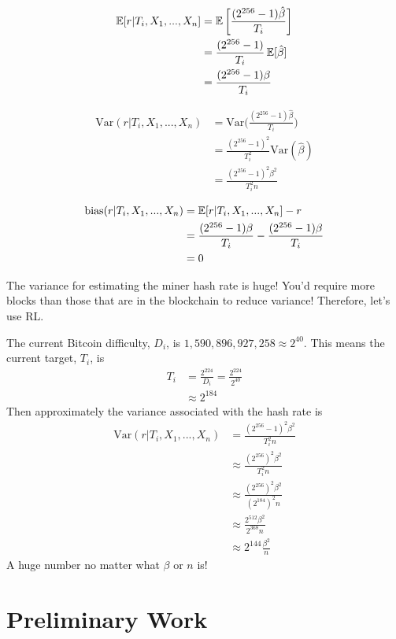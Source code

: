 \begin{align}
\operatorname{\mathbb{E}}[r|T_i,X_1,...,X_n] &= \operatorname{\mathbb{E}}\bigg[\frac{(2^{256}-1)\hat{\beta}}{T_i}\bigg] \\
&= \frac{(2^{256}-1)}{T_i}\operatorname{\mathbb{E}}[\hat{\beta}] \\
&= \frac{(2^{256}-1)\beta}{T_i}
\end{align}

\begin{align}
\text{Var}(r|T_i,X_1,...,X_n) &= \text{Var}\bigg(\frac{(2^{256}-1)\hat{\beta}}{T_i}\bigg) \\
&= \frac{(2^{256}-1)^2}{T_i^2} \text{Var}(\hat{\beta}) \\
&= \frac{(2^{256}-1)^2\beta^2}{T_i^2n}
\end{align}

\begin{align}
\text{bias}(r|T_i,X_1,...,X_n) &= \operatorname{\mathbb{E}}[r|T_i,X_1,...,X_n] - r \\
&= \frac{(2^{256}-1)\beta}{T_i} - \frac{(2^{256}-1)\beta}{T_i} \\
&= 0
\end{align}

The variance for estimating the miner hash rate is huge! You'd require more blocks than those that are in the blockchain to reduce variance! Therefore, let's use RL. 

The current Bitcoin difficulty, $D_i$, is $1,590,896,927,258 \approx 2^{40}$. This means the current target, $T_i$, is
\begin{align}
T_i &= \frac{2^{224}}{D_i} = \frac{2^{224}}{2^{40}} \\
&\approx 2^{184}
\end{align}
Then approximately the variance associated with the hash rate is 
\begin{align}
\text{Var}(r|T_i,X_1,...,X_n) &= \frac{(2^{256}-1)^2\beta^2}{T_i^2n} \\
&\approx  \frac{(2^{256})^2\beta^2}{T_i^2n} \\
&\approx  \frac{(2^{256})^2\beta^2}{(2^{184})^2n} \\
&\approx  \frac{2^{512}\beta^2}{2^{368}n} \\
&\approx  2^{144}\frac{\beta^2}{n}
\end{align}
A huge number no matter what $\beta$ or $n$ is!

\section{Preliminary Work}
